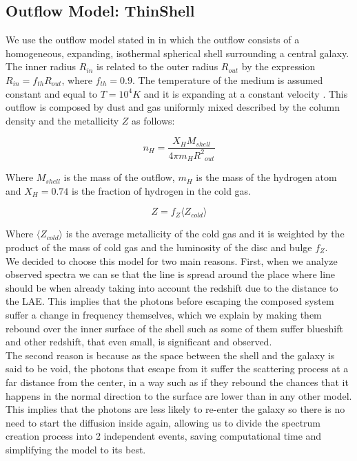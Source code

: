 \documentclass{latex/emulateapj}
\begin{document}
\subsection{Outflow Model: ThinShell}

We use the outflow model stated in \citep{Orsi12} in which the outflow consists of a homogeneous, expanding, isothermal spherical shell surrounding a central galaxy. The inner radius $R_{in}$ is related to the outer radius $R_{out}$ by the expression $R_{in} = f_{th}R_{out}$, where $f_{th}=0.9$. The temperature of the medium is assumed constant and equal to $T=10^4 K$ and it is expanding at a constant velocity \vel. This outflow is composed by dust and gas uniformly mixed described by the column density \nh and the metallicity $Z$ as follows:

\begin{equation}
\label{eq:nh}
n_H = \frac{X_H M_{shell}}{4\pi m_H {R^2}_{out}}
\end{equation}

Where $M_{shell}$ is the mass of the outflow, $m_H$ is the mass of the hydrogen atom and $X_H=0.74$ is the fraction of hydrogen in the cold gas.

\begin{equation}
\label{eq:z}
Z = f_Z \langle Z_{cold} \rangle
\end{equation}

Where $\langle Z_{cold} \rangle$ is the average metallicity of the cold gas and it is weighted by the product of the mass of cold gas and the \lya luminosity of the disc and bulge $f_Z$. \\

We decided to choose this model for two main reasons. First, when we analyze observed spectra we can se that the line is spread around the place where line should be when already taking into account the redshift due to the distance to the LAE. This implies that the photons before escaping the composed system suffer a change in frequency themselves, which we explain by making them rebound over the inner surface of the shell such as some of them suffer blueshift and other redshift, that even small, is significant and observed.\\

The second reason is because as the space between the shell and the galaxy is said to be void, the photons that escape from it suffer the scattering process at a far distance from the center, in a way such as if they rebound the chances that it happens in the normal direction to the surface are lower than in any other model. This implies that the photons are less likely to re-enter the galaxy so there is no need to start the diffusion inside again, allowing us to divide the spectrum creation process into 2 independent events, saving computational time and simplifying the model to its best. \\
\end{document}
